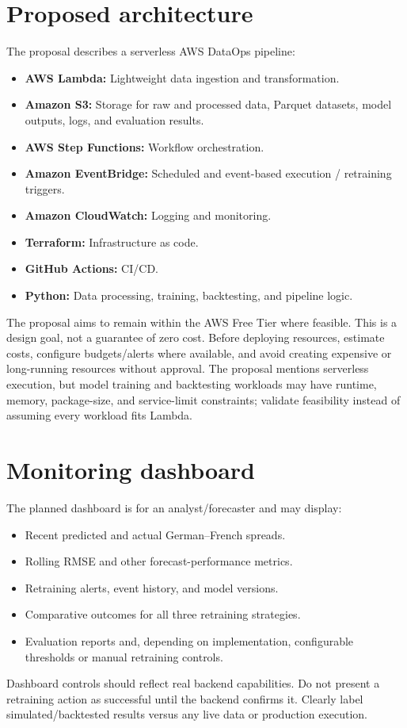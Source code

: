 \documentclass[11pt,a4paper]{article}
\begin{document}
\section{Proposed architecture}
The proposal describes a serverless AWS DataOps pipeline:
\begin{itemize}
  \item \textbf{AWS Lambda:} Lightweight data ingestion and transformation.
  \item \textbf{Amazon S3:} Storage for raw and processed data, Parquet datasets, model outputs, logs, and evaluation results.
  \item \textbf{AWS Step Functions:} Workflow orchestration.
  \item \textbf{Amazon EventBridge:} Scheduled and event-based execution / retraining triggers.
  \item \textbf{Amazon CloudWatch:} Logging and monitoring.
  \item \textbf{Terraform:} Infrastructure as code.
  \item \textbf{GitHub Actions:} CI/CD.
  \item \textbf{Python:} Data processing, training, backtesting, and pipeline logic.
\end{itemize}
The proposal aims to remain within the AWS Free Tier where feasible. This is a design goal, not a guarantee of zero cost. Before deploying resources, estimate costs, configure budgets/alerts where available, and avoid creating expensive or long-running resources without approval. The proposal mentions serverless execution, but model training and backtesting workloads may have runtime, memory, package-size, and service-limit constraints; validate feasibility instead of assuming every workload fits Lambda.

\section{Monitoring dashboard}
The planned dashboard is for an analyst/forecaster and may display:
\begin{itemize}
  \item Recent predicted and actual German--French spreads.
  \item Rolling RMSE and other forecast-performance metrics.
  \item Retraining alerts, event history, and model versions.
  \item Comparative outcomes for all three retraining strategies.
  \item Evaluation reports and, depending on implementation, configurable thresholds or manual retraining controls.
\end{itemize}
Dashboard controls should reflect real backend capabilities. Do not present a retraining action as successful until the backend confirms it. Clearly label simulated/backtested results versus any live data or production execution.
\end{document}
